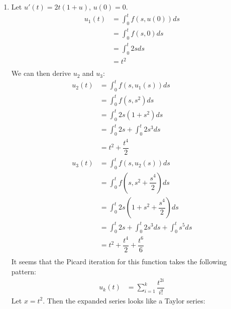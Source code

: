\documentclass{article}
\begin{document}
\begin{enumerate}
    \item
        Let $u'(t) = 2t(1+u)$, $u(0)=0$. \\
        \begin{equation*}
            \begin{split}
                u_1(t) & = \int_{0}^{t} f(s, u(0))ds \\
                    & = \int_{0}^{t} f(s, 0)ds \\
                    & = \int_{0}^{t} 2sds \\
                    & = t^2 \\
            \end{split}
        \end{equation*}
        We can then derive $u_2$ and $u_3$:
        \begin{equation*}
            \begin{split}
                u_2(t) & = \int_{0}^{t} f(s, u_1(s))ds \\
                    & = \int_{0}^{t} f(s, s^2)ds \\
                    & = \int_{0}^{t} 2s(1+s^2)ds \\
                    & = \int_{0}^{t} 2s + \int_{0}^{t} 2s^3ds \\
                    & = t^2 + \dfrac{t^4}{2} \\
                u_3(t) & = \int_{0}^{t} f(s, u_2(s))ds \\
                    & = \int_{0}^{t} f(s, s^2 + \dfrac{s^4}{2})ds \\
                    & = \int_{0}^{t} 2s(1+s^2+\dfrac{s^4}{2})ds \\
                    & = \int_{0}^{t} 2s + \int_{0}^{t} 2s^3ds + \int_{0}^{t} s^5ds \\
                    & = t^2 + \dfrac{t^4}{2} + \dfrac{t^6}{6} \\
            \end{split}
        \end{equation*}
        It seems that the Picard iteration for this function takes the following pattern: \\
        \begin{equation*}
            \begin{split}
                u_k(t) & = \sum_{i=1}^{k} \dfrac{t^{2i}}{i!}
            \end{split}
        \end{equation*}
        Let $x=t^2$. Then the expanded series looks like a Taylor series: \\

\end{enumerate}
\end{document}
